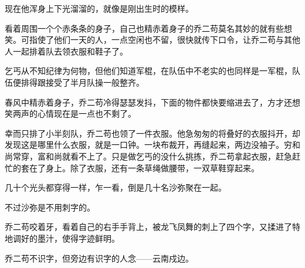 现在他浑身上下光溜溜的，就像是刚出生时的模样。

看着周围一个个赤条条的身子，自己也精赤着身子的乔二苟莫名其妙的就有些想笑。可指使了他们一天的人，一点空闲也不留，很快就传下口令，让乔二苟与其他人一起排着队去领衣服和鞋子了。

乞丐从不知纪律为何物，但他们知道军棍，在队伍中不老实的也同样是一军棍，队伍便排得跟接受了半月队操一般整齐。

春风中精赤着身子，乔二苟冷得瑟瑟发抖，下面的物件都快要缩进去了，方才还想笑两声的心情现在是一点也不剩了。

幸而只排了小半刻队，乔二苟也领了一件衣服。他急匆匆的将叠好的衣服抖开，却发现这是哪里什么衣服，就是一口钟。一块布裁开，再缝起来，两边没袖子。穷和尚常穿，富和尚就看不上了。只是做乞丐的没什么挑拣，乔二苟拿起衣服，赶急赶忙的套在了身上。除了衣服，还有一条草绳做腰带，一双草鞋穿起来。

几十个光头都穿得一样，乍一看，倒是几十名沙弥聚在一起。

不过沙弥是不用刺字的。

乔二苟咬着牙，看着自己的右手手背上，被龙飞凤舞的刺上了四个字，又揉进了特地调好的墨汁，使得字迹鲜明。

乔二苟不识字，但旁边有识字的人念——云南戍边。

